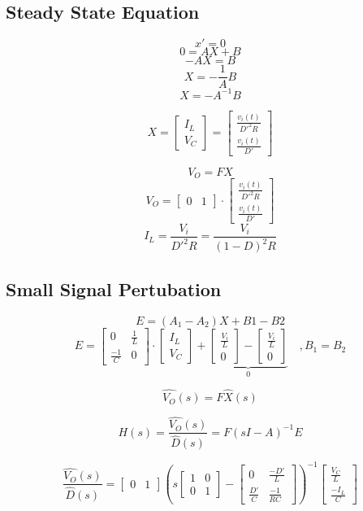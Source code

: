 \subsection{Steady State Equation}

\[ x' = 0 \]
\[ 0 = AX + B \]
\[ -AX = B \]
\[ X = -\frac{1}{A}B \]
\[ X = -A^{-1}B \]

\[
	X
	=
	\begin{bmatrix}
		I_L \\
		V_C
	\end{bmatrix}
	=
	\begin{bmatrix}
		\frac{v_i(t)}{D'^2 R} \\
		\frac{v_i(t)}{D'}
	\end{bmatrix}
\]

\[ V_O = F X \]
\[
	V_O
	= 
	\begin{bmatrix}
		0 & 1
	\end{bmatrix}
	\cdot
	\begin{bmatrix}
		\frac{v_i(t)}{D'^2 R} \\
		\frac{v_i(t)}{D'}
	\end{bmatrix}
\]
\[
	I_L
	= \frac{V_i}{D'^2 R}
	= \frac{V_i}{(1-D)^2 R}
\]

\subsection{Small Signal Pertubation}
\[	E = (A_1 - A_2)X + B1 - B2 \]
\[
	E =
	\begin{bmatrix}
		0 & \frac{1}{L} \\
		\frac{-1}{C} & 0
	\end{bmatrix}
	\cdot
	\begin{bmatrix}
		I_L \\
		V_C
	\end{bmatrix}
	+ \underbrace{
	\begin{bmatrix}
		\frac{V_i}{L} \\
		0
	\end{bmatrix}
	-
	\begin{bmatrix}
		\frac{V_i}{L} \\
		0
	\end{bmatrix}}_{0}
	\quad, B_1 = B_2
\]

\[
	\hat{V_O}(s) = F\hat{X}(s)
\]

\[
	H(s)
	= \frac{\hat{V_O}(s)}{\hat{D}(s)}
	= F ( s I - A )^{-1} E
\]

\[
	\frac{\hat{V_O}(s)}{\hat{D}(s)}
	=
	\begin{bmatrix}
		0 & 1
	\end{bmatrix}
	\left( s 
	\begin{bmatrix}
		1 & 0 \\
		0 & 1
	\end{bmatrix}
	-
	\begin{bmatrix}
		0 & \frac{-D'}{L} \\
		\frac{D'}{C} & \frac{-1}{R C}
	\end{bmatrix}
	\right)^{-1}
	\begin{bmatrix}
		\frac{V_C}{L} \\
		\frac{-I_L}{C}
	\end{bmatrix}
\]

